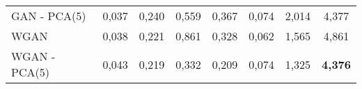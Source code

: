 \begin{table}[h]
{\begin{tabular}{lccccccc}
GAN - PCA(5)          & 0,037                                                                  & 0,240                                         & 0,559                                             & 0,367                                                              & 0,074                                                           & 2,014                                                                                & 4,377                                                                                \\
WGAN                          & 0,038                                                                  & 0,221                                         & 0,861                                             & 0,328                                                              & 0,062                                                           & 1,565                                                                                & 4,861                                                                                \\
WGAN - PCA(5)        & 0,043                                                                  & 0,219                                         & 0,332                                             & 0,209                                                              & 0,074                                                           & 1,325                                                                                & \textbf{4,376}                                                                               \\
\bottomrule
\end{tabular}}
\label{table:full_path}
\end{table}

